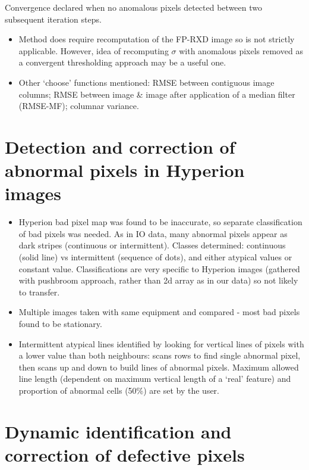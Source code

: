 \documentclass[10pt,fleqn]{article}
\begin{document}
\begin{itemize}
Convergence declared when no anomalous pixels detected between two subsequent iteration steps.

\begin{itemize}
\item
Method does require recomputation of the FP-RXD image so is not strictly applicable. However, idea of recomputing $\sigma$ with anomalous pixels removed as a convergent thresholding approach may be a useful one.

\item
Other `choose' functions mentioned: RMSE between contiguous image columns; RMSE between image \& image after application of a median filter (RMSE-MF); columnar variance.
\end{itemize}

\end{itemize}

\section{Detection and correction of abnormal pixels in Hyperion images \cite{Han2002}}

\begin{itemize}
\item
Hyperion bad pixel map was found to be inaccurate, so separate classification of bad pixels was needed. As in IO data, many abnormal pixels appear as dark stripes (continuous or intermittent). Classes determined: continuous (solid line) vs intermittent (sequence of dots), and either atypical values or constant value. Classifications are very specific to Hyperion images (gathered with pushbroom approach, rather than 2d array as in our data) so not likely to transfer.

\item
Multiple images taken with same equipment and compared - most bad pixels found to be stationary.

\item 
Intermittent atypical lines identified by looking for vertical lines of pixels with a lower value than both neighbours: scans rows to find single abnormal pixel, then scans up and down to build lines of abnormal pixels. Maximum allowed line length (dependent on maximum vertical length of a `real' feature) and proportion of abnormal cells (50\%) are set by the user.
\end{itemize}

\section{Dynamic identification and correction of defective pixels \cite{Pinto2012}}
\label{Pinto2012}
\end{document}
